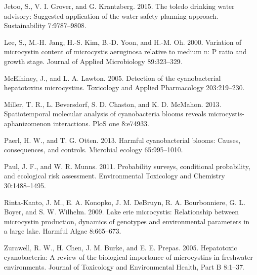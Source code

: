 \documentclass[11pt,]{article}
\begin{document}
Jetoo, S., V. I. Grover, and G. Krantzberg. 2015. The toledo drinking
water advisory: Suggested application of the water safety planning
approach. Sustainability 7:9787--9808.

Lee, S., M.-H. Jang, H.-S. Kim, B.-D. Yoon, and H.-M. Oh. 2000.
Variation of microcystin content of microcystis aeruginosa relative to
medium n: P ratio and growth stage. Journal of Applied Microbiology
89:323--329.

McElhiney, J., and L. A. Lawton. 2005. Detection of the cyanobacterial
hepatotoxins microcystins. Toxicology and Applied Pharmacology
203:219--230.

Miller, T. R., L. Beversdorf, S. D. Chaston, and K. D. McMahon. 2013.
Spatiotemporal molecular analysis of cyanobacteria blooms reveals
microcystis-aphanizomenon interactions. PloS one 8:e74933.

Paerl, H. W., and T. G. Otten. 2013. Harmful cyanobacterial blooms:
Causes, consequences, and controls. Microbial ecology 65:995--1010.

Paul, J. F., and W. R. Munns. 2011. Probability surveys, conditional
probability, and ecological risk assessment. Environmental Toxicology
and Chemistry 30:1488--1495.

Rinta-Kanto, J. M., E. A. Konopko, J. M. DeBruyn, R. A. Bourbonniere, G.
L. Boyer, and S. W. Wilhelm. 2009. Lake erie microcystis: Relationship
between microcystin production, dynamics of genotypes and environmental
parameters in a large lake. Harmful Algae 8:665--673.

Zurawell, R. W., H. Chen, J. M. Burke, and E. E. Prepas. 2005.
Hepatotoxic cyanobacteria: A review of the biological importance of
microcystins in freshwater environments. Journal of Toxicology and
Environmental Health, Part B 8:1--37.
\end{document}

